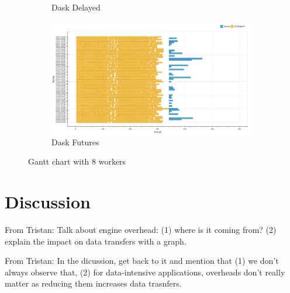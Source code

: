 \documentclass[conference]{IEEEtran}
\newcommand{\TG}[1]{\color{cyan}From Tristan: #1 \color{black}}
\begin{document}
\begin{figure}[!htb]
\begin{subfigure}[b]{\columnwidth}
        \caption{Dask Delayed}\label{fig:bids_dask_delayed_gantt}
    \end{subfigure}
    \hfill
    \begin{subfigure}[b]{\columnwidth}
        \includegraphics[clip,width=\columnwidth]{images/futures_bids_gantt.png}%
        \caption{Dask Futures}\label{fig:bids_dask_futures_gantt}
    \end{subfigure}
    \caption{Gantt chart with 8 workers}\label{fig:bids_gantt}
\end{figure}



\section{Discussion}

\TG{Talk about engine overhead: (1) where is it coming from? (2) 
explain the impact on data transfers with a graph.}

\TG{In the dicussion, get back to it and mention that (1) we don't
always observe that, (2) for data-intensive applications, overheads don't really matter
as reducing them increases data trasnfers.}
\end{document}
